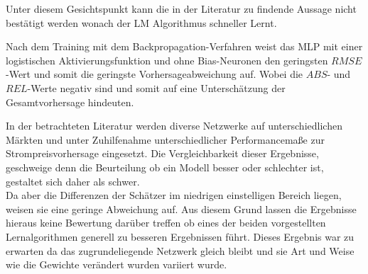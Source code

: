 Unter diesem Gesichtspunkt kann die in der Literatur zu findende Aussage nicht bestätigt werden wonach der LM Algorithmus schneller Lernt.


Nach dem Training mit dem Backpropagation-Verfahren weist das MLP mit einer logistischen Aktivierungsfunktion und ohne Bias-Neuronen den geringsten $RMSE$-Wert und somit die geringste Vorhersageabweichung auf. Wobei die $ABS$- und $REL$-Werte negativ sind und somit auf eine Unterschätzung der Gesamtvorhersage hindeuten. 






In der betrachteten Literatur werden diverse Netzwerke auf unterschiedlichen Märkten und unter Zuhilfenahme unterschiedlicher Performancemaße zur Strompreisvorhersage eingesetzt. Die Vergleichbarkeit dieser Ergebnisse, geschweige denn die Beurteilung ob ein Modell besser oder schlechter ist, gestaltet sich daher als schwer.\\ 


Da aber die Differenzen der Schätzer im niedrigen einstelligen Bereich liegen, weisen sie eine geringe Abweichung auf. Aus diesem Grund lassen die Ergebnisse hieraus keine Bewertung darüber treffen ob eines der beiden vorgestellten Lernalgorithmen generell zu besseren Ergebnissen führt. Dieses Ergebnis war zu erwarten da das zugrundeliegende Netzwerk gleich bleibt und sie Art und Weise wie die Gewichte verändert wurden variiert wurde. 



